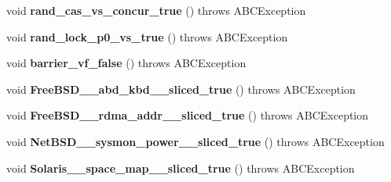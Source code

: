 \begin{DoxyCompactItemize}
\item 
\hypertarget{classedu_1_1udel_1_1cis_1_1vsl_1_1civl_1_1PthreadCProverTest_a67d8dca108c64f38698284c0260ecff0}{}void {\bfseries rand\+\_\+cas\+\_\+vs\+\_\+concur\+\_\+true} ()  throws A\+B\+C\+Exception \label{classedu_1_1udel_1_1cis_1_1vsl_1_1civl_1_1PthreadCProverTest_a67d8dca108c64f38698284c0260ecff0}

\item 
\hypertarget{classedu_1_1udel_1_1cis_1_1vsl_1_1civl_1_1PthreadCProverTest_aedf3f220352bf1feb8fc3dbbea19090f}{}void {\bfseries rand\+\_\+lock\+\_\+p0\+\_\+vs\+\_\+true} ()  throws A\+B\+C\+Exception \label{classedu_1_1udel_1_1cis_1_1vsl_1_1civl_1_1PthreadCProverTest_aedf3f220352bf1feb8fc3dbbea19090f}

\item 
\hypertarget{classedu_1_1udel_1_1cis_1_1vsl_1_1civl_1_1PthreadCProverTest_a2f6c525734679790ba2c6a503e0507b0}{}void {\bfseries barrier\+\_\+vf\+\_\+false} ()  throws A\+B\+C\+Exception \label{classedu_1_1udel_1_1cis_1_1vsl_1_1civl_1_1PthreadCProverTest_a2f6c525734679790ba2c6a503e0507b0}

\item 
\hypertarget{classedu_1_1udel_1_1cis_1_1vsl_1_1civl_1_1PthreadCProverTest_aa4870a2ce283501359d2c5868ee2aa02}{}void {\bfseries Free\+B\+S\+D\+\_\+\+\_\+abd\+\_\+kbd\+\_\+\+\_\+sliced\+\_\+true} ()  throws A\+B\+C\+Exception \label{classedu_1_1udel_1_1cis_1_1vsl_1_1civl_1_1PthreadCProverTest_aa4870a2ce283501359d2c5868ee2aa02}

\item 
\hypertarget{classedu_1_1udel_1_1cis_1_1vsl_1_1civl_1_1PthreadCProverTest_acf15aa9288322eb70fec13ba5fef578d}{}void {\bfseries Free\+B\+S\+D\+\_\+\+\_\+rdma\+\_\+addr\+\_\+\+\_\+sliced\+\_\+true} ()  throws A\+B\+C\+Exception \label{classedu_1_1udel_1_1cis_1_1vsl_1_1civl_1_1PthreadCProverTest_acf15aa9288322eb70fec13ba5fef578d}

\item 
\hypertarget{classedu_1_1udel_1_1cis_1_1vsl_1_1civl_1_1PthreadCProverTest_ae4d68e03a6962d957ad5517eb273f811}{}void {\bfseries Net\+B\+S\+D\+\_\+\+\_\+sysmon\+\_\+power\+\_\+\+\_\+sliced\+\_\+true} ()  throws A\+B\+C\+Exception \label{classedu_1_1udel_1_1cis_1_1vsl_1_1civl_1_1PthreadCProverTest_ae4d68e03a6962d957ad5517eb273f811}

\item 
\hypertarget{classedu_1_1udel_1_1cis_1_1vsl_1_1civl_1_1PthreadCProverTest_ab9df8da9432c5d45b2aa9890a300f443}{}void {\bfseries Solaris\+\_\+\+\_\+space\+\_\+map\+\_\+\+\_\+sliced\+\_\+true} ()  throws A\+B\+C\+Exception \label{classedu_1_1udel_1_1cis_1_1vsl_1_1civl_1_1PthreadCProverTest_ab9df8da9432c5d45b2aa9890a300f443}


\end{DoxyCompactItemize}

